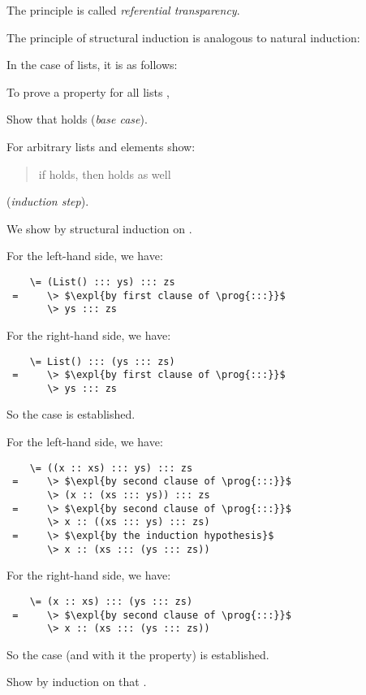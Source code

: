 {The principle is called {\em\emph{referential transparency}}.
\es
{}

The principle of structural induction is analogous to natural induction:

In the case of lists, it is as follows:

To prove a property  for all lists ,
\be
\item Show that  holds (\emph{base case}).
\item For arbitrary lists  and elements  
      show:
\begin{quote}
     if  holds, then  holds as well
\end{quote}
(\emph{induction step}).
\ee

\es
{}

We show  by structural induction
on .

For the left-hand side, we have:
\begin{lstlisting}
    \= (List() ::: ys) ::: zs
 =     \> $\expl{by first clause of \prog{:::}}$
       \> ys ::: zs
\end{lstlisting}
For the right-hand side, we have:
\begin{lstlisting}
    \= List() ::: (ys ::: zs)
 =     \> $\expl{by first clause of \prog{:::}}$
       \> ys ::: zs
\end{lstlisting}
So the case is established.

\es
\bs
{} 

For the left-hand side, we have:
\begin{lstlisting}
    \= ((x :: xs) ::: ys) ::: zs
 =     \> $\expl{by second clause of \prog{:::}}$
       \> (x :: (xs ::: ys)) ::: zs
 =     \> $\expl{by second clause of \prog{:::}}$
       \> x :: ((xs ::: ys) ::: zs)
 =     \> $\expl{by the induction hypothesis}$
       \> x :: (xs ::: (ys ::: zs))
\end{lstlisting}

For the right-hand side, we have:
\begin{lstlisting}
    \= (x :: xs) ::: (ys ::: zs)
 =     \> $\expl{by second clause of \prog{:::}}$
       \> x :: (xs ::: (ys ::: zs))
\end{lstlisting}
So the case (and with it the property) is established.

\begin{exercise}
Show by induction on  that .
\es
{}
\end{exercise}

}
